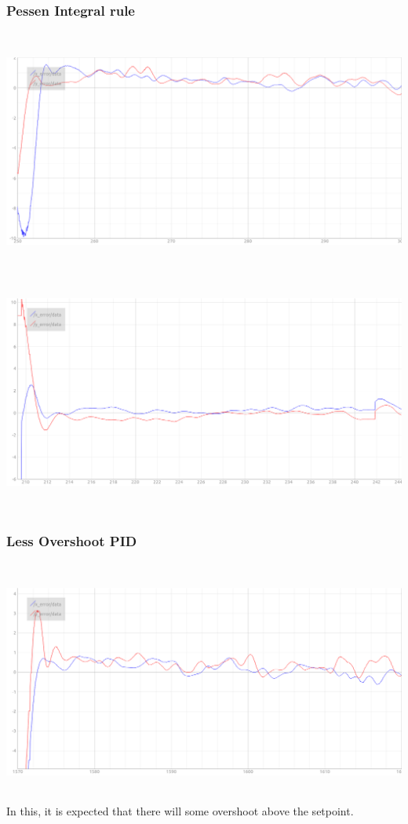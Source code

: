 \documentclass[a4paper,12pt,oneside]{book}
\begin{document}
\subsubsection{Pessen Integral rule}
\begin{flushleft}
\includegraphics[width = 15cm , height= 8cm]{Pessen-rule.png}
\vspace{1em}
\includegraphics[width = 15cm , height= 8cm]{pessen-rule2.png}
\end{flushleft}

\subsubsection{Less Overshoot PID}
\begin{flushleft}
\includegraphics[width = 15cm , height= 8cm]{less-overshoot-pid.png}
In this, it is expected that there will some overshoot above the setpoint.
\end{flushleft}
 
\end{document}
